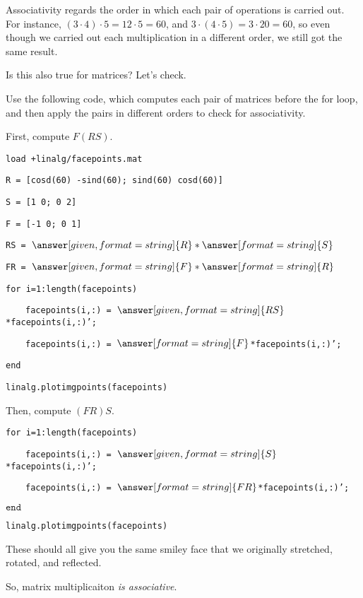 \documentclass{ximera}
\begin{document}
    \begin{example}

        Associativity regards the order in which each pair of operations is carried out. For instance, $(3\cdot 4)\cdot 5=12\cdot 5=60$, and $3\cdot (4\cdot 5)=3\cdot 20=60$, so even though we carried out each multiplication in a different order, we still got the same result.

        Is this also true for matrices? Let's check.

        Use the following code, which computes each pair of matrices before the for loop, and then apply the pairs in different orders to check for associativity.

        First, compute $F(RS)$.

        \vspace{1cm}


\texttt{load +linalg/face\textunderscore points.mat}

\texttt{R = [cosd(60) -sind(60); sind(60) cosd(60)]}

\texttt{S = [1 0; 0 2]}

\texttt{F = [-1 0; 0 1]}

\texttt{RS = }$\answer[given,format=string]{R}*\answer[format=string]{S}$

\texttt{FR = }$\answer[given,format=string]{F}*\answer[format=string]{R}$

\texttt{for i=1:length(face\textunderscore points)}

$\qquad $\texttt{face\textunderscore points(i,:) = }$\answer[given,format=string]{RS}$\texttt{*face\textunderscore points(i,:)';}

$\qquad $\texttt{face\textunderscore points(i,:) = }$\answer[format=string]{F}$\texttt{*face\textunderscore points(i,:)';}

\texttt{end}

\texttt{linalg.plot\textunderscore img\textunderscore points(face\textunderscore points)}

\vspace{1cm}

        Then, compute $(FR)S$.

        \vspace{1cm}

\texttt{for i=1:length(face\textunderscore points)}

$\qquad $\texttt{face\textunderscore points(i,:) = }$\answer[given,format=string]{S}$\texttt{*face\textunderscore points(i,:)';}

$\qquad $\texttt{face\textunderscore points(i,:) = }$\answer[format=string]{FR}$\texttt{*face\textunderscore points(i,:)';}

$\texttt{end}$

\texttt{linalg.plot\textunderscore img\textunderscore points(face\textunderscore points)}

\vspace{1cm}

These should all give you the same smiley face that we originally stretched, rotated, and reflected.

So, matrix multiplicaiton \emph{is associative}.

    \end{example}
\end{document}
